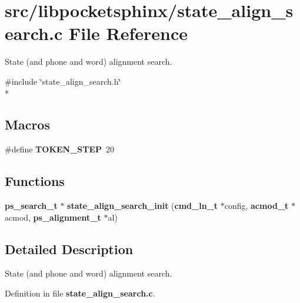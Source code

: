 \section{src/libpocketsphinx/state\-\_\-align\-\_\-search.c File Reference}
\label{state__align__search_8c}


State (and phone and word) alignment search.  


{\ttfamily \#include \char`\"{}state\-\_\-align\-\_\-search.\-h\char`\"{}}\\*
\subsection*{Macros}
\begin{DoxyCompactItemize}
\item 
\#define {\bfseries T\-O\-K\-E\-N\-\_\-\-S\-T\-E\-P}~20\label{state__align__search_8c_a197a0cf5b150b88b0e3043fd78550931}

\end{DoxyCompactItemize}
\subsection*{Functions}
\begin{DoxyCompactItemize}
\item 
{\bf ps\-\_\-search\-\_\-t} $\ast$ {\bfseries state\-\_\-align\-\_\-search\-\_\-init} ({\bf cmd\-\_\-ln\-\_\-t} $\ast$config, {\bf acmod\-\_\-t} $\ast$acmod, {\bf ps\-\_\-alignment\-\_\-t} $\ast$al)\label{state__align__search_8c_a7263b71e3838f0689963439c8b695e15}

\end{DoxyCompactItemize}


\subsection{Detailed Description}
State (and phone and word) alignment search. 

Definition in file {\bf state\-\_\-align\-\_\-search.\-c}.

